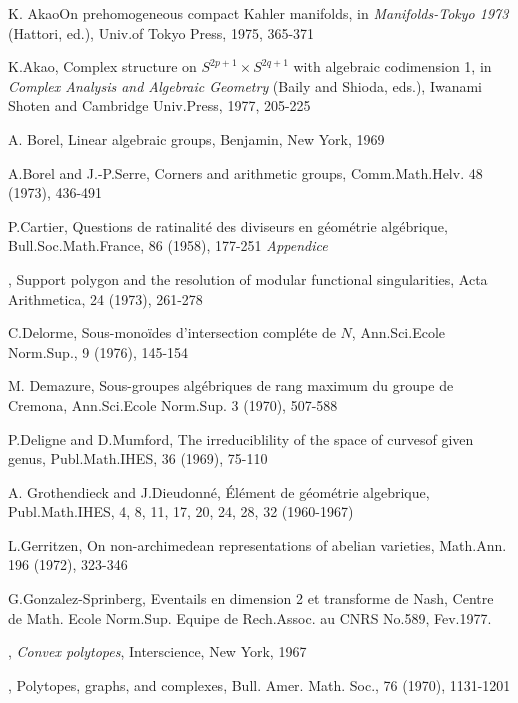 \begin{thebibliography}{99}
 {K. Akao}\pageoriginale On prehomogeneous compact
  Kahler manifolds, in   \textit {Manifolds-Tokyo 1973} (Hattori,
  ed.), Univ.of Tokyo   Press, 1975, 365-371  

 {K.Akao}, Complex structure on $S^{2p+1} \times S^{2q+1}$
  with algebraic codimension 1, in \textit{Complex Analysis and
    Algebraic Geometry} (Baily and Shioda, eds.), Iwanami Shoten and
  Cambridge Univ.Press, 1977, 205-225 

 {A. Borel}, Linear algebraic groups, Benjamin, New York,
  1969 

 {A.Borel and J.-P.Serre}, Corners and arithmetic
  groups, Comm.Math.Helv. 48 (1973), 436-491 

 {P.Cartier}, Questions de ratinalit\'e des diviseurs en
  g\'eom\'etrie alg\'ebrique, Bull.Soc.Math.France, 86 (1958), 177-251
  \textit{Appendice}
 
, Support polygon and the resolution of modular
  functional singularities, Acta Arithmetica, 24 (1973), 261-278 

 {C.Delorme}, Sous-mono\"ides d'intersection compl\'ete
  de $N$, Ann.Sci.Ecole Norm.Sup., 9 (1976), 145-154 

 {M. Demazure}, Sous-groupes alg\'ebriques de rang
  maximum du groupe de Cremona, Ann.Sci.Ecole Norm.Sup. 3 (1970),
  507-588 

 {P.Deligne and D.Mumford}, The irreduciblility of the
  space of curves\pageoriginale of given genus, Publ.Math.IHES, 36
  (1969), 75-110   

 {A. Grothendieck and J.Dieudonn\'e}, \'El\'ement de
  g\'eom\'etrie  algebrique, Publ.Math.IHES,
  4, 8, 11, 17, 20, 24, 28, 32 (1960-1967)  

 {L.Gerritzen}, On non-archimedean representations of
  abelian varieties, Math.Ann. 196 (1972), 323-346 

 {G.Gonzalez-Sprinberg}, Eventails en dimension 2 et
  transforme de Nash, Centre de Math. Ecole Norm.Sup. Equipe de
  Rech.Assoc. au CNRS  No.589, Fev.1977. 

, \textit{Convex polytopes}, Interscience,
  New York, 1967 

, Polytopes, graphs, and complexes, Bull.
  Amer. Math. Soc., 76 (1970),  1131-1201 


\end{thebibliography}
